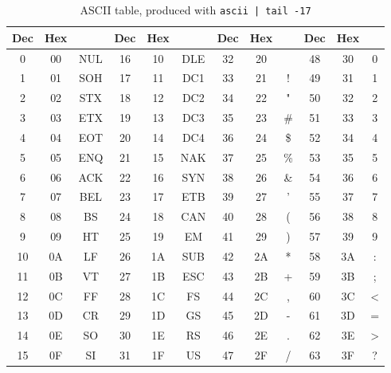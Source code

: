 
\begin{table}
  \begin{tabular}{|c|c|c||c|c|c||c|c|c||c|c|c|}                       \hline
    Dec & Hex &    & Dec & Hex &    & Dec & Hex &   & Dec & Hex &  \\ \hline
    0  & 00 & NUL  & 16 & 10 & DLE  & 32 & 20 &     & 48 & 30 & 0  \\
    1  & 01 & SOH  & 17 & 11 & DC1  & 33 & 21 & !   & 49 & 31 & 1  \\
    2  & 02 & STX  & 18 & 12 & DC2  & 34 & 22 & "   & 50 & 32 & 2  \\
    3  & 03 & ETX  & 19 & 13 & DC3  & 35 & 23 & \#  & 51 & 33 & 3  \\
    4  & 04 & EOT  & 20 & 14 & DC4  & 36 & 24 & \$  & 52 & 34 & 4  \\
    5  & 05 & ENQ  & 21 & 15 & NAK  & 37 & 25 & \%  & 53 & 35 & 5  \\
    6  & 06 & ACK  & 22 & 16 & SYN  & 38 & 26 & \&  & 54 & 36 & 6  \\
    7  & 07 & BEL  & 23 & 17 & ETB  & 39 & 27 & '   & 55 & 37 & 7  \\
    8  & 08 & BS   & 24 & 18 & CAN  & 40 & 28 & (   & 56 & 38 & 8  \\
    9  & 09 & HT   & 25 & 19 & EM   & 41 & 29 & )   & 57 & 39 & 9  \\
    10 & 0A & LF   & 26 & 1A & SUB  & 42 & 2A & *   & 58 & 3A & :  \\
    11 & 0B & VT   & 27 & 1B & ESC  & 43 & 2B & +   & 59 & 3B & ;  \\
    12 & 0C & FF   & 28 & 1C & FS   & 44 & 2C & ,   & 60 & 3C & <  \\
    13 & 0D & CR   & 29 & 1D & GS   & 45 & 2D & -   & 61 & 3D & =  \\
    14 & 0E & SO   & 30 & 1E & RS   & 46 & 2E & .   & 62 & 3E & >  \\
    15 & 0F & SI   & 31 & 1F & US   & 47 & 2F & /   & 63 & 3F & ?  \\ \hline
  \end{tabular}
  \caption{ASCII table, produced with \texttt{ascii | tail -17}}
\end{table}
